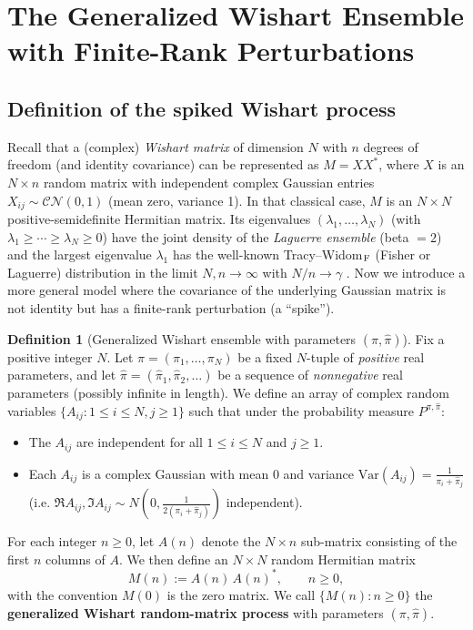 \documentclass[letterpaper,11pt,oneside,reqno]{article}
\numberwithin{equation}{section}
\theoremstyle{definition}
\newtheorem{definition}[proposition]{Definition}
\begin{document}
\section{The Generalized Wishart Ensemble with Finite-Rank Perturbations}
\subsection{Definition of the spiked Wishart process}
Recall that a (complex) \emph{Wishart matrix} of dimension $N$ with $n$ degrees of freedom (and identity covariance) can be represented as $M = X X^*$, where $X$ is an $N\times n$ random matrix with independent complex Gaussian entries $X_{ij}\sim \mathcal{CN}(0,1)$ (mean zero, variance 1). In that classical case, $M$ is an $N\times N$ positive-semidefinite Hermitian matrix. Its eigenvalues $(\lambda_1,\dots,\lambda_N)$ (with $\lambda_1\ge \cdots \ge \lambda_N \ge 0$) have the joint density of the \emph{Laguerre ensemble} (beta $=2$) and the largest eigenvalue $\lambda_1$ has the well-known Tracy--Widom$_{\rm F}$ (Fisher or Laguerre) distribution in the limit $N,n\to\infty$ with $N/n\to\gamma$ \cite{Johnstone2001}. Now we introduce a more general model where the covariance of the underlying Gaussian matrix is not identity but has a finite-rank perturbation (a ``spike'').

\begin{definition}[Generalized Wishart ensemble with parameters $(\pi,\hat\pi)$]\label{def:Wishart}
Fix a positive integer $N$. Let $\pi=(\pi_1,\dots,\pi_N)$ be a fixed $N$-tuple of \emph{positive} real parameters, and let $\hat\pi = (\hat\pi_1,\hat\pi_2,\dots)$ be a sequence of \emph{nonnegative} real parameters (possibly infinite in length). We define an array of complex random variables $\{A_{ij}: 1\le i\le N, j\ge 1\}$ such that under the probability measure $P^{\pi,\hat\pi}$:
\begin{itemize}\item The $A_{ij}$ are independent for all $1\le i\le N$ and $j\ge 1$.
\item Each $A_{ij}$ is a complex Gaussian with mean $0$ and variance $\mathrm{Var}(A_{ij}) = \frac{1}{\pi_i + \hat\pi_j}$ (i.e. $\Re A_{ij}, \Im A_{ij} \sim N(0,\frac{1}{2(\pi_i+\hat\pi_j)})$ independent).
\end{itemize}
For each integer $n\ge 0$, let $A(n)$ denote the $N\times n$ sub-matrix consisting of the first $n$ columns of $A$. We then define an $N\times N$ random Hermitian matrix
\[ M(n) := A(n)\,A(n)^*, \qquad n\ge 0, \]
with the convention $M(0)$ is the zero matrix. We call $\{M(n): n\ge 0\}$ the \textbf{generalized Wishart random-matrix process} with parameters $(\pi,\hat\pi)$.
\end{definition}
\end{document}
